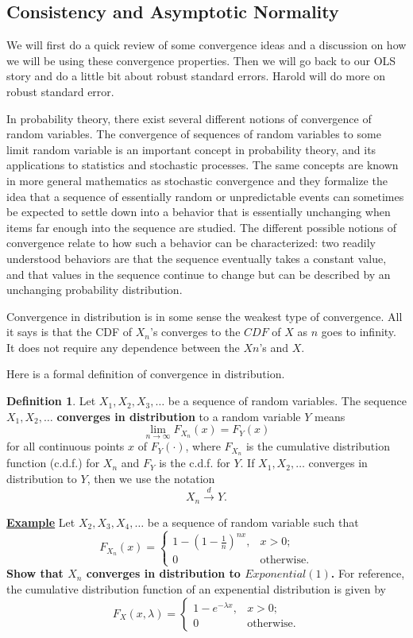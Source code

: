 \documentclass[11pt,a4paper]{amsart}
\theoremstyle{plain}
\theoremstyle{definition}
\newtheorem{definition}{Definition}
\begin{document}
\subsection{Consistency and Asymptotic Normality}
	We will first do a quick review of some convergence ideas and a discussion on how we will be using these convergence properties. Then we will go back to our OLS story and do a little bit about robust standard errors. Harold will do more on robust standard error.\par 
	In probability theory, there exist several different notions of convergence of random variables. The convergence of sequences of random variables to some limit random variable is an important concept in probability theory, and its applications to statistics and stochastic processes. The same concepts are known in more general mathematics as stochastic convergence and they formalize the idea that a sequence of essentially random or unpredictable events can sometimes be expected to settle down into a behavior that is essentially unchanging when items far enough into the sequence are studied. The different possible notions of convergence relate to how such a behavior can be characterized: two readily understood behaviors are that the sequence eventually takes a constant value, and that values in the sequence continue to change but can be described by an unchanging probability distribution.\par 
	Convergence in distribution is in some sense the weakest type of convergence. All it says is that the CDF of $X_{n}$'s converges to the $CDF$ of $X$ as $n$ goes to infinity. It does not require any dependence between the $Xn$'s and $X$.\par
	Here is a formal definition of convergence in distribution.
	\begin{definition}
		Let $X_{1}, X_{2}, X_{3}, \dots$ be a sequence of random variables. The sequence $X_{1}, X_{2}, \dots$ \textbf{converges in distribution} to a random variable $Y$ means 
		\[	\lim_{n \to \infty} F_{X_{n}}(x) = F_{Y}(x)	\]
		for all continuous points $x$ of $F_{Y}(\cdot)$, where $F_{X_{n}}$ is the cumulative distribution function (c.d.f.) for $X_{n}$ and $F_{Y}$ is the c.d.f. for $Y$. If $X_{1}, X_{2}, \dots$ converges in distribution to $Y$, then we use  the notation 
		\[	X_{n} \xrightarrow{d} Y. \]
	\end{definition}
	\begin{framed}
		\underline{\textbf{Example}}  Let $X_{2}, X_{3}, X_{4}, \dots$ be a sequence of random variable such that 
		\[	F_{X_{n}}(x) = \begin{cases}
				1 - (1- \frac{1}{n})^{nx}, &x > 0; \\
				0 &\text{otherwise}.
		\end{cases}	\]
		\textbf{Show that $X_{n}$ converges in distribution to $Exponential(1)$.}\newline
		For reference, the cumulative distribution function of an expenential distribution is given by \[F_{X}(x, \lambda) = \begin{cases}
		1 - e^{-\lambda x}, &x > 0; \\
		0 &\text{otherwise}.
		\end{cases} \]
	\end{framed}
\end{document}
